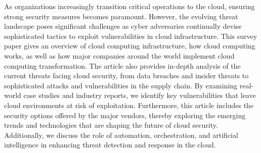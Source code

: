 As organizations increasingly transition critical operations to the cloud, ensuring strong security measures becomes paramount. However, the evolving threat landscape poses significant challenges as cyber adversaries continually devise sophisticated tactics to exploit vulnerabilities in cloud infrastructure. This survey paper gives an overview of cloud computing infrastructure, how cloud computing works, as well as how major companies around the world implement cloud computing transformation. The article also provides in-depth analysis of the current threats facing cloud security, from data breaches and insider threats to sophisticated attacks and vulnerabilities in the supply chain. By examining real-world case studies and industry reports, we identify key vulnerabilities that leave cloud environments at risk of exploitation. Furthermore, this article includes the security options offered by the major vendors, thereby exploring the emerging trends and technologies that are shaping the future of cloud security. Additionally, we discuss the role of automation, orchestration, and artificial intelligence in enhancing threat detection and response in the cloud.